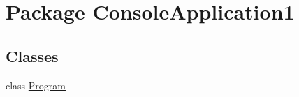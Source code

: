 \hypertarget{namespace_console_application1}{
\section{Package ConsoleApplication1}
\label{namespace_console_application1}
}
\subsection*{Classes}
\begin{DoxyCompactItemize}
\item 
class \hyperlink{class_console_application1_1_1_program}{Program}
\end{DoxyCompactItemize}

